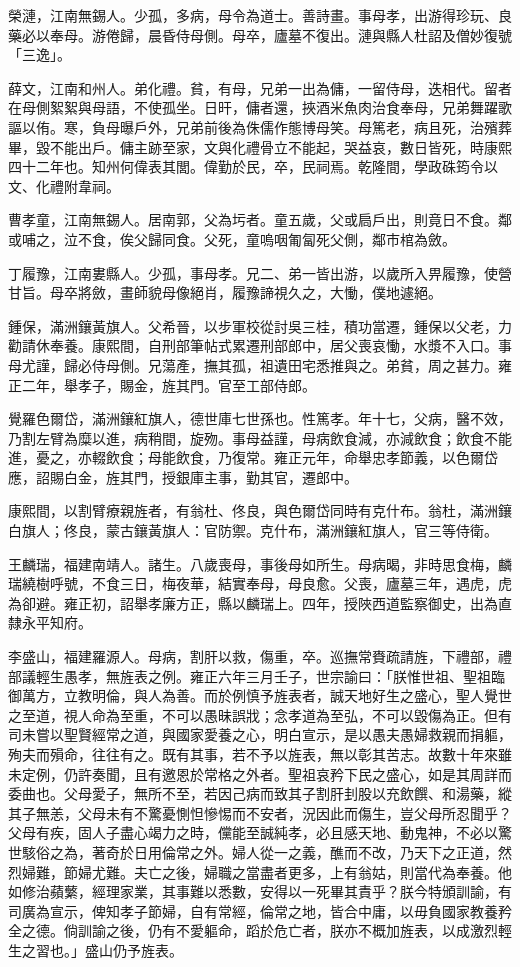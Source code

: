 \begin{pinyinscope}
榮漣，江南無錫人。少孤，多病，母令為道士。善詩畫。事母孝，出游得珍玩、良藥必以奉母。游倦歸，晨昏侍母側。母卒，廬墓不復出。漣與縣人杜詔及僧妙復號「三逸」。

薛文，江南和州人。弟化禮。貧，有母，兄弟一出為傭，一留侍母，迭相代。留者在母側絮絮與母語，不使孤坐。日旰，傭者還，挾酒米魚肉治食奉母，兄弟舞躍歌謳以侑。寒，負母曝戶外，兄弟前後為侏儒作態博母笑。母篤老，病且死，治殯葬畢，毀不能出戶。傭主跡至家，文與化禮骨立不能起，哭益哀，數日皆死，時康熙四十二年也。知州何偉表其閭。偉勤於民，卒，民祠焉。乾隆間，學政硃筠令以文、化禮附韋祠。

曹孝童，江南無錫人。居南郭，父為圬者。童五歲，父或扃戶出，則竟日不食。鄰或哺之，泣不食，俟父歸同食。父死，童嗚咽匍匐死父側，鄰市棺為斂。

丁履豫，江南婁縣人。少孤，事母孝。兄二、弟一皆出游，以歲所入畀履豫，使營甘旨。母卒將斂，畫師貌母像絕肖，履豫諦視久之，大慟，僕地遽絕。

鍾保，滿洲鑲黃旗人。父希晉，以步軍校從討吳三桂，積功當遷，鍾保以父老，力勸請休奉養。康熙間，自刑部筆帖式累遷刑部郎中，居父喪哀慟，水漿不入口。事母尤謹，歸必侍母側。兄蕩產，撫其孤，祖遺田宅悉推與之。弟貧，周之甚力。雍正二年，舉孝子，賜金，旌其門。官至工部侍郎。

覺羅色爾岱，滿洲鑲紅旗人，德世庫七世孫也。性篤孝。年十七，父病，醫不效，乃割左臂為糜以進，病稍間，旋歾。事母益謹，母病飲食減，亦減飲食；飲食不能進，憂之，亦輟飲食；母能飲食，乃復常。雍正元年，命舉忠孝節義，以色爾岱應，詔賜白金，旌其門，授銀庫主事，勤其官，遷郎中。

康熙間，以割臂療親旌者，有翁杜、佟良，與色爾岱同時有克什布。翁杜，滿洲鑲白旗人；佟良，蒙古鑲黃旗人：官防禦。克什布，滿洲鑲紅旗人，官三等侍衛。

王麟瑞，福建南靖人。諸生。八歲喪母，事後母如所生。母病暍，非時思食梅，麟瑞繞樹呼號，不食三日，梅夜華，結實奉母，母良愈。父喪，廬墓三年，遇虎，虎為卻避。雍正初，詔舉孝廉方正，縣以麟瑞上。四年，授陜西道監察御史，出為直隸永平知府。

李盛山，福建羅源人。母病，割肝以救，傷重，卒。巡撫常賚疏請旌，下禮部，禮部議輕生愚孝，無旌表之例。雍正六年三月壬子，世宗諭曰：「朕惟世祖、聖祖臨御萬方，立教明倫，與人為善。而於例慎予旌表者，誠天地好生之盛心，聖人覺世之至道，視人命為至重，不可以愚昧誤戕；念孝道為至弘，不可以毀傷為正。但有司未嘗以聖賢經常之道，與國家愛養之心，明白宣示，是以愚夫愚婦救親而捐軀，殉夫而殞命，往往有之。既有其事，若不予以旌表，無以彰其苦志。故數十年來雖未定例，仍許奏聞，且有邀恩於常格之外者。聖祖哀矜下民之盛心，如是其周詳而委曲也。父母愛子，無所不至，若因己病而致其子割肝刲股以充飲饌、和湯藥，縱其子無恙，父母未有不驚憂惻怛慘惕而不安者，況因此而傷生，豈父母所忍聞乎？父母有疾，固人子盡心竭力之時，儻能至誠純孝，必且感天地、動鬼神，不必以驚世駭俗之為，著奇於日用倫常之外。婦人從一之義，醮而不改，乃天下之正道，然烈婦難，節婦尤難。夫亡之後，婦職之當盡者更多，上有翁姑，則當代為奉養。他如修治蘋蘩，經理家業，其事難以悉數，安得以一死畢其責乎？朕今特頒訓諭，有司廣為宣示，俾知孝子節婦，自有常經，倫常之地，皆合中庸，以毋負國家教養矜全之德。倘訓諭之後，仍有不愛軀命，蹈於危亡者，朕亦不概加旌表，以成激烈輕生之習也。」盛山仍予旌表。


\end{pinyinscope}
